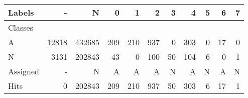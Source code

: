 \begin{tabular}{l|r|r|r|r|r|r|r|r|r|r}

Labels &      - &       N &    0 &    1 &    2 &   3 &    4 &  5 &   6 &  7 \\\hline
Classes  &        &         &      &      &      &     &      &    &     &    \\\hline
\hline
A        &  12818 &  432685 &  209 &  210 &  937 &   0 &  303 &  0 &  17 &  0 \\\hline
N        &   3131 &  202843 &   43 &    0 &  100 &  50 &  104 &  6 &   0 &  1 \\\hline
\hline
Assigned &      - &       N &    A &    A &    A &   N &    A &  N &   A &  N \\\hline
Hits     &      0 &  202843 &  209 &  210 &  937 &  50 &  303 &  6 &  17 &  1 
\end{tabular}
